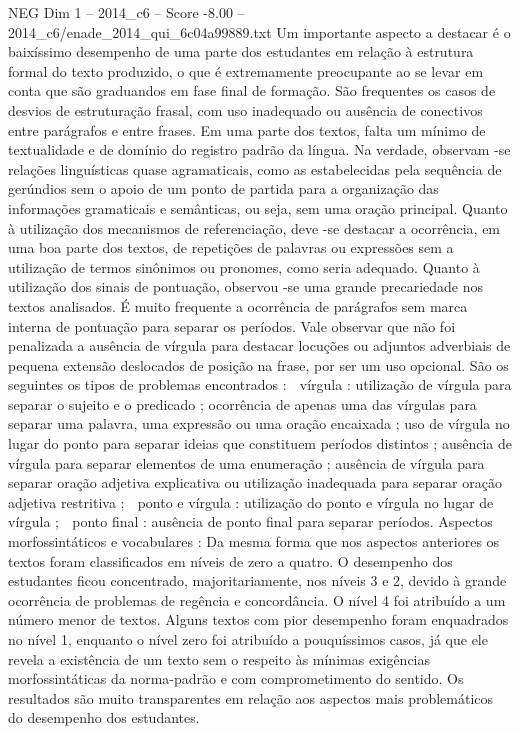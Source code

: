 \begin{textsample}{NEG Dim 1 – 2014\_c6 – Score -8.00 – 2014\_c6/enade\_2014\_qui\_6c04a99889.txt}
Um importante aspecto a destacar é o baixíssimo desempenho de uma parte dos estudantes em relação à estrutura formal do texto produzido, o que é extremamente preocupante ao se levar em conta que são graduandos em fase final de formação.
São frequentes os casos de desvios de estruturação frasal, com uso inadequado ou ausência de conectivos entre parágrafos e entre frases.
Em uma parte dos textos, falta um mínimo de textualidade e de domínio do registro padrão da língua.
Na verdade, observam -se relações linguísticas quase agramaticais, como as estabelecidas pela sequência de gerúndios sem o apoio de um ponto de partida para a organização das informações gramaticais e semânticas, ou seja, sem uma oração principal.
Quanto à utilização dos mecanismos de referenciação, deve -se destacar a ocorrência, em uma boa parte dos textos, de repetições de palavras ou expressões sem a utilização de termos sinônimos ou pronomes, como seria adequado.
Quanto à utilização dos sinais de pontuação, observou -se uma grande precariedade nos textos analisados.
É muito frequente a ocorrência de parágrafos sem marca interna de pontuação para separar os períodos.
Vale observar que não foi penalizada a ausência de vírgula para destacar locuções ou adjuntos adverbiais de pequena extensão deslocados de posição na frase, por ser um uso opcional.
São os seguintes os tipos de problemas encontrados :  vírgula : utilização de vírgula para separar o sujeito e o predicado ; ocorrência de apenas uma das vírgulas para separar uma palavra, uma expressão ou uma oração encaixada ; uso de vírgula no lugar do ponto para separar ideias que constituem períodos distintos ; ausência de vírgula para separar elementos de uma enumeração ; ausência de vírgula para separar oração adjetiva explicativa ou utilização inadequada para separar oração adjetiva restritiva ;  ponto e vírgula : utilização do ponto e vírgula no lugar de vírgula ;  ponto final : ausência de ponto final para separar períodos.
Aspectos morfossintáticos e vocabulares : Da mesma forma que nos aspectos anteriores os textos foram classificados em níveis de zero a quatro.
O desempenho dos estudantes ficou concentrado, majoritariamente, nos níveis 3 e 2, devido à grande ocorrência de problemas de regência e concordância.
O nível 4 foi atribuído a um número menor de textos.
Alguns textos com pior desempenho foram enquadrados no nível 1, enquanto o nível zero foi atribuído a pouquíssimos casos, já que ele revela a existência de um texto sem o respeito às mínimas exigências morfossintáticas da norma-padrão e com comprometimento do sentido.
Os resultados são muito transparentes em relação aos aspectos mais problemáticos do desempenho dos estudantes.

\end{textsample}
